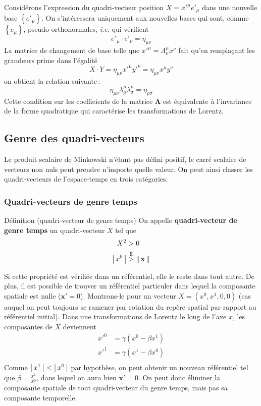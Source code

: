         Considérons l’expression du quadri-vecteur position $X = x'^{\mu} e'_{\mu}$ dans une nouvelle base $\left\{e'_{\mu}\right\}$. On s’intéressera uniquement aux nouvelles bases qui sont, comme $\left\{e_{\mu}\right\}$, pseudo-orthonormales, \textit{i.e.} qui vérifient 
        \[ e'_{\mu} \cdot e'_{\nu} = \eta_{\mu\nu} \]
        La matrice de changement de base telle que $x'^{\mu} = \Lambda_{\nu}^{\mu} x^{\nu}$ fait qu’en remplaçant les grandeurs prime dans l’égalité 
        \[ X \cdot Y = \eta_{\mu\nu} x'^{\mu} y'^{\nu} = \eta_{\mu\nu} x^{\mu} y^{\nu} \]   
        on obtient la relation suivante :
        \[ \eta_{\mu\nu} \lambda^{\mu}_{\rho} \lambda^{\nu}_{\sigma} = \eta_{\rho\sigma} \]   
        Cette condition sur les coefficients de la matrice $\symbf{\Lambda}$ est équivalente à l’invariance de la forme quadratique qui caractérise les transformations de Lorentz. 
    \subsection{Genre des quadri-vecteurs}

    Le produit scalaire de Minkowski n’étant pas défini positif, le carré scalaire de vecteurs non nuls peut prendre n’importe quelle valeur. On peut ainsi classer les quadri-vecteurs de l’espace-temps en trois catégories.

        \subsubsection{Quadri-vecteurs de genre temps}

        \begin{omed}{Définition (quadri-vecteur de genre temps)}
            On appelle \textbf{quadri-vecteur de genre temps} un quadri-vecteur $X$ tel que 
            \begin{align*}
                X^2 &> 0 \\
                \left\lvert \, x^0 \, \right\rvert &\overset{\Updownarrow}{>} \left\lVert \, \mathbf{x} \, \right\rVert \\
            \end{align*}
        \end{omed}

        Si cette propriété est vérifiée dans un référentiel, elle le reste dans tout autre. De plus, il est possible de trouver un référentiel particuler dans lequel la composante spatiale est nulle ($\mathbf{x}' = 0$). Montrons-le pour un vecteur $X = (x^0, x^1, 0, 0)$ (cas auquel on peut toujours se ramener par rotation du repère spatial par rapport au référentiel initial). Dans une transformations de Lorentz le long de l’axe $x$, les composantes de $X$ deviennent 
        \begin{align*}
            x'^0 &= \gamma (x^0 - \beta x^1) \\
            x'^1 &= \gamma (x^1 - \beta x^0) \\
        \end{align*}
        Comme $\left\lvert \, x^1 \, \right\rvert < \left\lvert \, x^0 \, \right\rvert$ par hypothèse, on peut obtenir un nouveau référentiel tel que $\beta = \frac{x^1}{x^0}$, dans lequel on aura bien $\mathbf{x}' = 0$. On peut donc éliminer la composante spatiale de tout quadri-vecteur du genre temps, mais pas sa composante temporelle.

